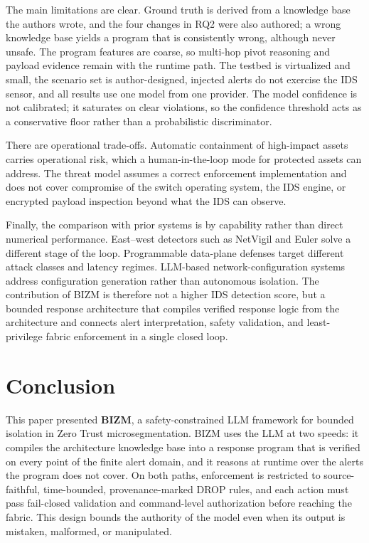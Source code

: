 \documentclass[final,5p]{elsarticle}
\begin{document}
The main limitations are clear. Ground truth is derived from a knowledge base the authors wrote, and the four changes in RQ2 were also authored; a wrong knowledge base yields a program that is consistently wrong, although never unsafe. The program features are coarse, so multi-hop pivot reasoning and payload evidence remain with the runtime path. The testbed is virtualized and small, the scenario set is author-designed, injected alerts do not exercise the IDS sensor, and all results use one model from one provider. The model confidence is not calibrated; it saturates on clear violations, so the confidence threshold acts as a conservative floor rather than a probabilistic discriminator.

There are operational trade-offs. Automatic containment of high-impact assets carries operational risk, which a human-in-the-loop mode for protected assets can address. The threat model assumes a correct enforcement implementation and does not cover compromise of the switch operating system, the IDS engine, or encrypted payload inspection beyond what the IDS can observe.

Finally, the comparison with prior systems is by capability rather than direct numerical performance. East--west detectors such as NetVigil and Euler solve a different stage of the loop. Programmable data-plane defenses target different attack classes and latency regimes. LLM-based network-configuration systems address configuration generation rather than autonomous isolation. The contribution of BIZM is therefore not a higher IDS detection score, but a bounded response architecture that compiles verified response logic from the architecture and connects alert interpretation, safety validation, and least-privilege fabric enforcement in a single closed loop.

\section{Conclusion}
\label{sec:conclusion}
This paper presented \textbf{BIZM}, a safety-constrained LLM framework for bounded isolation in Zero Trust microsegmentation. BIZM uses the LLM at two speeds: it compiles the architecture knowledge base into a response program that is verified on every point of the finite alert domain, and it reasons at runtime over the alerts the program does not cover. On both paths, enforcement is restricted to source-faithful, time-bounded, provenance-marked DROP rules, and each action must pass fail-closed validation and command-level authorization before reaching the fabric. This design bounds the authority of the model even when its output is mistaken, malformed, or manipulated.
\end{document}
